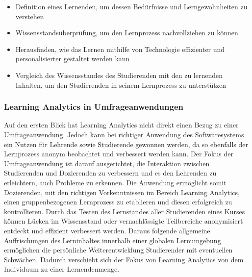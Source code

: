 \begin{itemize}
    \item Definition eines Lernenden, um dessen Bedürfnisse und Lerngewohnheiten zu verstehen
    \item Wissensstandsüberprüfung, um den Lernprozess nachvollziehen zu können
    \item Herausfinden, wie das Lernen mithilfe von Technologie effizienter und personalisierter gestaltet werden kann
    \item Vergleich des Wissensstandes des Studierenden mit den zu lernenden Inhalten, um den Studierenden in seinem Lernprozess zu unterstützen
\end{itemize}

\subsubsection{Learning Analytics in Umfrageanwendungen}
Auf den ersten Blick hat Learning Analytics nicht direkt einen Bezug zu einer Umfrageanwendung.
Jedoch kann bei richtiger Anwendung des Softwaresystems ein Nutzen für Lehrende sowie Studierende gewonnen werden, da so ebenfalls der Lernprozess anonym beobachtet und verbessert werden kann.
Der Fokus der Umfrageanwendung ist darauf ausgerichtet, die Interaktion zwischen Studierenden und Dozierenden zu verbessern und es den Lehrenden zu erleichtern, auch Probleme zu erkennen.
Die Anwendung ermöglicht somit Dozierenden, mit den richtigen Vorkenntnissen im Bereich Learning Analytics, einen gruppenbezogenen Lernprozess zu etablieren und diesen erfolgreich zu kontrollieren.
Durch das Testen des Lernstandes aller Studierenden eines Kurses können Lücken im Wissensstand oder vernachlässigte Teilbereiche anonymisiert entdeckt und effizient verbessert werden.
Daraus folgende allgemeine Auffrischungen des Lerninhaltes innerhalb einer globalen Lernumgebung ermöglichen die persönliche Weiterentwicklung Studierender mit eventuellen Schwächen.
Dadurch verschiebt sich der Fokus von Learning Analytics von dem Individuum zu einer Lernendenmenge.
